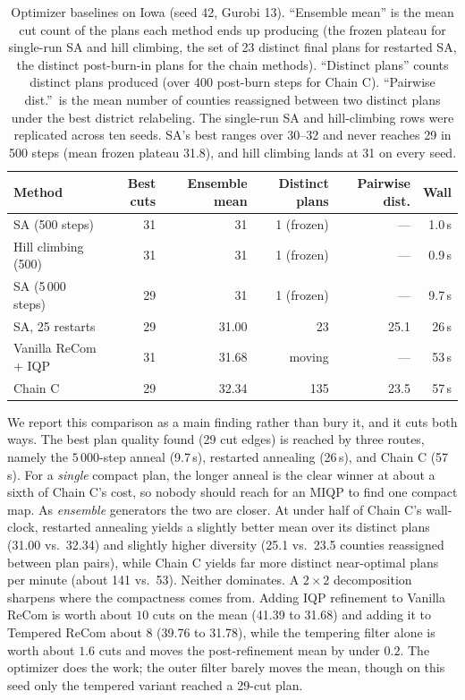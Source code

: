 \documentclass[11pt]{article}
\begin{document}
\begin{table}[htbp]
\centering
\small
\begin{tabular}{lrrrrr}
\toprule
Method & Best cuts & Ensemble mean & Distinct plans & Pairwise dist. & Wall \\
\midrule
SA (500 steps)           & 31 & 31    & 1 (frozen)  & ---  & 1.0\,s \\
Hill climbing (500)      & 31 & 31    & 1 (frozen)  & ---  & 0.9\,s \\
SA (5\,000 steps)        & 29 & 31    & 1 (frozen)  & ---  & 9.7\,s \\
SA, 25 restarts          & 29 & 31.00 & 23          & 25.1 & 26\,s \\
Vanilla ReCom + IQP      & 31 & 31.68 & moving      & ---  & 53\,s \\
Chain C                  & 29 & 32.34 & 135         & 23.5 & 57\,s \\
\bottomrule
\end{tabular}
\caption{Optimizer baselines on Iowa (seed 42,
  Gurobi 13). ``Ensemble mean'' is the mean cut count of the plans
  each method ends up producing (the frozen plateau for single-run
  SA and hill climbing, the set of 23 distinct final plans for
  restarted SA, the distinct post-burn-in plans for the chain
  methods). ``Distinct plans'' counts distinct plans produced (over
  400 post-burn steps for Chain C). ``Pairwise dist.''\ is the mean
  number of counties reassigned between two distinct plans under the
  best district relabeling. The single-run SA and hill-climbing rows
  were replicated across ten seeds. SA's best ranges over 30--32 and
  never reaches 29 in 500 steps (mean frozen plateau 31.8), and hill
  climbing lands at 31 on every
  seed.}\label{tab:optimizer-baselines}
\end{table}

We report this comparison as a main finding rather than bury it, and
it cuts both ways. The best plan quality found (29 cut edges) is
reached by three routes, namely the $5\,000$-step anneal (9.7\,s),
restarted annealing (26\,s), and Chain C (57\,s). For a
\emph{single} compact plan, the longer anneal is the clear winner at
about a sixth of Chain C's cost, so nobody should reach for an MIQP
to find one compact map. As \emph{ensemble} generators the two are
closer. At under half of Chain C's wall-clock, restarted annealing yields a
slightly better mean over its distinct plans (31.00 vs.\ 32.34) and
slightly higher diversity (25.1 vs.\ 23.5 counties reassigned between
plan pairs), while Chain C yields far more distinct near-optimal
plans per minute (about 141 vs.\ 53). Neither dominates. A
$2 \times 2$
decomposition sharpens where the compactness comes from. Adding IQP
refinement to Vanilla ReCom is worth about $10$ cuts on the mean
(41.39 to 31.68) and adding it to Tempered ReCom about $8$ (39.76 to
31.78), while the tempering filter alone is worth about $1.6$ cuts
and moves the post-refinement mean by under $0.2$. The optimizer does
the work; the outer filter barely moves the mean, though on this seed
only the tempered variant reached a 29-cut plan.
\end{document}
